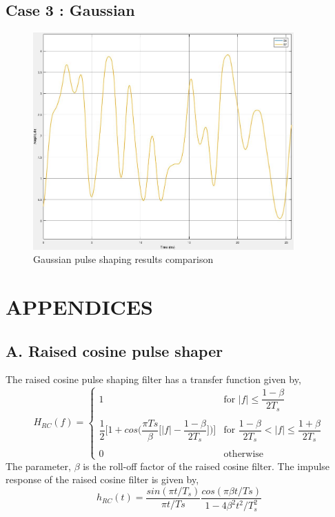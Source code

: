 \subsection*{Case 3 : Gaussian}
\begin{figure}[h]
	\centering
	\includegraphics[width=10cm]{./algorithms/filter/figures/S6_S7_gaussian.jpg}
	\caption{Gaussian pulse shaping results comparison}
	\label{S6_S7_gaussian}
\end{figure}



\section*{APPENDICES}
\subsection*{A. Raised cosine pulse shaper}
The raised cosine pulse shaping filter has a transfer function given by,
\begin{equation}
H_{RC}(f) = \begin{cases}
1 &\text{for $|f|\leq \dfrac{1-\beta}{2T_s}$}\\ \\
\dfrac{1}{2} \bigg[1 + cos\bigg(\dfrac{\pi Ts}{\beta}\bigg[|f|- \dfrac{1-\beta}{2T_s} \bigg]\bigg)\bigg] &\text{for $\dfrac{1-\beta}{2T_s}<|f|\leq\dfrac{1+\beta}{2T_s}$}\\ \\
0 & \text{otherwise}
\end{cases}
\end{equation}
The parameter, $\beta$ is the roll-off factor of the raised cosine filter. The impulse response of the raised cosine filter is given by,
\begin{equation}
h_{RC}(t) = \dfrac{sin(\pi t/T_s)}{\pi t/Ts}\dfrac{cos(\pi \beta t/Ts)}{1-4 \beta^2 t^2/T_{s}^2 }
\label{hRC}
\end{equation}

